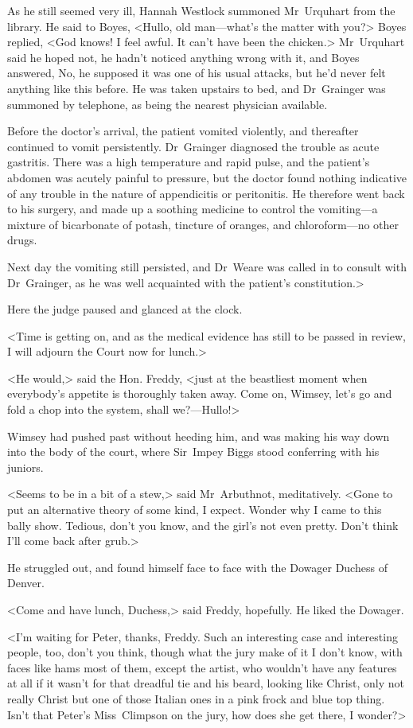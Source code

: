 As he still seemed very ill, Hannah Westlock summoned Mr~Urquhart from the library. He said to Boyes, <Hullo, old man—what's the matter with you?> Boyes replied, <God knows! I feel awful. It can't have been the chicken.> Mr~Urquhart said he hoped not, he hadn't noticed anything wrong with it, and Boyes answered, No, he supposed it was one of his usual attacks, but he'd never felt anything like this before. He was taken upstairs to bed, and Dr~Grainger was summoned by telephone, as being the nearest physician available.

Before the doctor's arrival, the patient vomited violently, and thereafter continued to vomit persistently. Dr~Grainger diagnosed the trouble as acute gastritis. There was a high temperature and rapid pulse, and the patient's abdomen was acutely painful to pressure, but the doctor found nothing indicative of any trouble in the nature of appendicitis or peritonitis. He therefore went back to his surgery, and made up a soothing medicine to control the vomiting—a mixture of bicarbonate of potash, tincture of oranges, and chloroform—no other drugs.

Next day the vomiting still persisted, and Dr~Weare was called in to consult with Dr~Grainger, as he was well acquainted with the patient's constitution.>

Here the judge paused and glanced at the clock.

<Time is getting on, and as the medical evidence has still to be passed in review, I will adjourn the Court now for lunch.>

<He would,> said the Hon. Freddy, <just at the beastliest moment when everybody's appetite is thoroughly taken away. Come on, Wimsey, let's go and fold a chop into the system, shall we?—Hullo!>

Wimsey had pushed past without heeding him, and was making his way down into the body of the court, where Sir~Impey Biggs stood conferring with his juniors.

<Seems to be in a bit of a stew,> said Mr~Arbuthnot, meditatively. <Gone to put an alternative theory of some kind, I expect. Wonder why I came to this bally show. Tedious, don't you know, and the girl's not even pretty. Don't think I'll come back after grub.>

He struggled out, and found himself face to face with the Dowager Duchess of Denver.

<Come and have lunch, Duchess,> said Freddy, hopefully. He liked the Dowager.

<I'm waiting for Peter, thanks, Freddy. Such an interesting case and interesting people, too, don't you think, though what the jury make of it I don't know, with faces like hams most of them, except the artist, who wouldn't have any features at all if it wasn't for that dreadful tie and his beard, looking like Christ, only not really Christ but one of those Italian ones in a pink frock and blue top thing. Isn't that Peter's Miss~Climpson on the jury, how does she get there, I wonder?>

